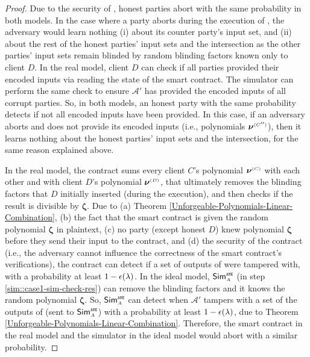 \begin{proof}
Due to the security of \vopr, honest parties abort with the same probability in both models. In the case where a party aborts during the execution of \vopr, the adversary would learn nothing (i) about its counter party's input set, and (ii) about the rest of the honest parties' input sets and the intersection as the other parties' input sets remain blinded by random blinding factors known only to client $D$. In the real model, client $D$ can check if all parties provided their encoded inputs via reading the state of the smart contract.  The simulator can perform the same check to ensure  $\mathcal{A}'$ has provided the encoded inputs of all corrupt parties. So, in both models, an honest party with the same probability detects if not all encoded inputs have been provided. In this case, if an adversary aborts and does not provide its encoded inputs (i.e., polynomials ${\bm\nu}^{ \scriptscriptstyle {  {(C'')}} }$), then it learns nothing about the honest parties' input sets and the intersection, for the same reason explained above. 



In the real model,  the contract sums every client $C$'s polynomial $\bm\nu^{ \scriptscriptstyle {  {(C)}} }$ with each other and with client $D$'s polynomial $\bm\nu^{ \scriptscriptstyle {  {(D)}} }$, that ultimately removes the blinding factors that  $D$ initially inserted (during the \vopr execution), and then checks if the result is divisible by  $\bm \zeta$. Due to (a) Theorem \ref{Unforgeable-Polynomials-Linear-Combination}, (b) the fact that the smart contract is given the random polynomial $\bm \zeta$ in plaintext, (c) no party (except honest $D$) knew polynomial $\bm \zeta$ before they send their input to the contract, and (d) the security of the contract (i.e., the adversary cannot influence the correctness of the smart contract's verifications), the contract can detect if a set of outputs of \vopr were tampered with, with a probability at least $1-\epsilon(\lambda)$. In the ideal model, $\mathsf{Sim}^{\scriptscriptstyle \mathtt{ANE}}_{\scriptscriptstyle A}$ (in step \ref{sim::case1-sim-check-res}) can remove the blinding factors and it knows the random polynomial ${\bm \zeta}$. So, $\mathsf{Sim}^{\scriptscriptstyle \mathtt{ANE}}_{\scriptscriptstyle A}$ can detect when $\mathcal{A}'$ tampers with a set of the outputs of \vopr (sent to  $\mathsf{Sim}^{\scriptscriptstyle \mathtt{ANE}}_{\scriptscriptstyle A}$) with a probability at least $1-\epsilon(\lambda)$,  due to Theorem \ref{Unforgeable-Polynomials-Linear-Combination}. Therefore, the smart contract in the real model and the simulator in the ideal model would abort with a similar probability. 





\end{proof}
